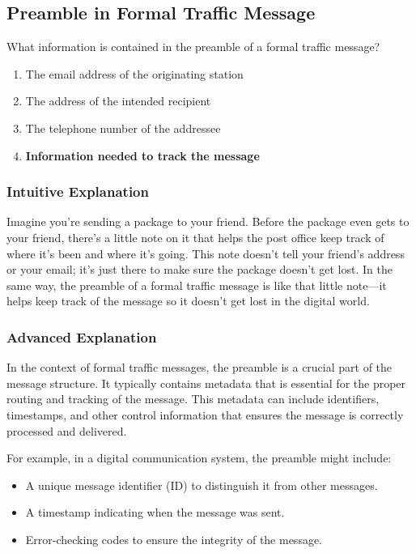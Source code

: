 \subsection{Preamble in Formal Traffic Message}
\label{T2C10}

\begin{tcolorbox}[colback=gray!10!white,colframe=black!75!black,title=T2C10]
What information is contained in the preamble of a formal traffic message?
\begin{enumerate}[label=\Alph*]
    \item The email address of the originating station
    \item The address of the intended recipient
    \item The telephone number of the addressee
    \item \textbf{Information needed to track the message}
\end{enumerate}
\end{tcolorbox}

\subsubsection{Intuitive Explanation}
Imagine you're sending a package to your friend. Before the package even gets to your friend, there's a little note on it that helps the post office keep track of where it's been and where it's going. This note doesn't tell your friend's address or your email; it's just there to make sure the package doesn't get lost. In the same way, the preamble of a formal traffic message is like that little note—it helps keep track of the message so it doesn't get lost in the digital world.

\subsubsection{Advanced Explanation}
In the context of formal traffic messages, the preamble is a crucial part of the message structure. It typically contains metadata that is essential for the proper routing and tracking of the message. This metadata can include identifiers, timestamps, and other control information that ensures the message is correctly processed and delivered. 

For example, in a digital communication system, the preamble might include:
\begin{itemize}
    \item A unique message identifier (ID) to distinguish it from other messages.
    \item A timestamp indicating when the message was sent.
    \item Error-checking codes to ensure the integrity of the message.
\end{itemize}

